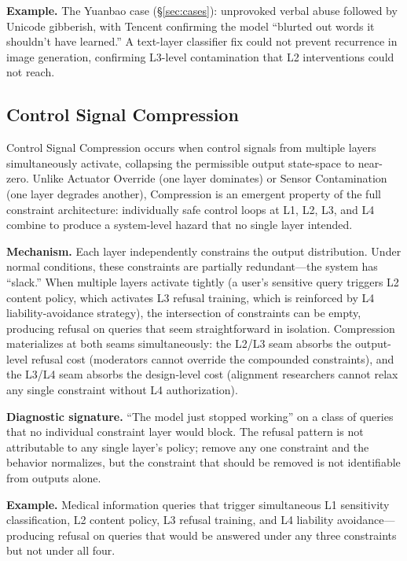 \documentclass[11pt]{article}
\begin{document}
\textbf{Example.} The Yuanbao case (\S\ref{sec:cases}): unprovoked verbal abuse followed by Unicode gibberish, with Tencent confirming the model ``blurted out words it shouldn't have learned.'' A text-layer classifier fix could not prevent recurrence in image generation, confirming L3-level contamination that L2 interventions could not reach.

\subsection{Control Signal Compression}

Control Signal Compression occurs when control signals from multiple layers simultaneously activate, collapsing the permissible output state-space to near-zero. Unlike Actuator Override (one layer dominates) or Sensor Contamination (one layer degrades another), Compression is an emergent property of the full constraint architecture: individually safe control loops at L1, L2, L3, and L4 combine to produce a system-level hazard that no single layer intended.

\textbf{Mechanism.} Each layer independently constrains the output distribution. Under normal conditions, these constraints are partially redundant---the system has ``slack.'' When multiple layers activate tightly (a user's sensitive query triggers L2 content policy, which activates L3 refusal training, which is reinforced by L4 liability-avoidance strategy), the intersection of constraints can be empty, producing refusal on queries that seem straightforward in isolation. Compression materializes at both seams simultaneously: the L2/L3 seam absorbs the output-level refusal cost (moderators cannot override the compounded constraints), and the L3/L4 seam absorbs the design-level cost (alignment researchers cannot relax any single constraint without L4 authorization).

\textbf{Diagnostic signature.} ``The model just stopped working'' on a class of queries that no individual constraint layer would block. The refusal pattern is not attributable to any single layer's policy; remove any one constraint and the behavior normalizes, but the constraint that should be removed is not identifiable from outputs alone.

\textbf{Example.} Medical information queries that trigger simultaneous L1 sensitivity classification, L2 content policy, L3 refusal training, and L4 liability avoidance---producing refusal on queries that would be answered under any three constraints but not under all four.
\end{document}
